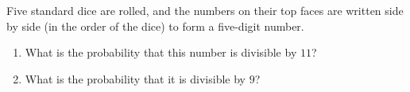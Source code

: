 Five standard dice are rolled, and the numbers on their top faces are written side by side (in the order of the dice) to form a five-digit number.
\begin{enumerate}
\item[(a)] What is the probability that this number is divisible by \(11\)?
\item[(b)] What is the probability that it is divisible by \(9\)?
\end{enumerate}
